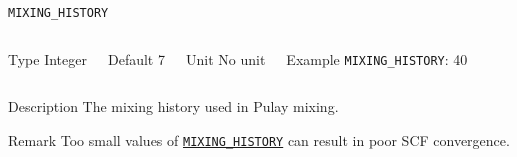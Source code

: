 \begin{frame}[allowframebreaks]{\texttt{MIXING\_HISTORY}} \label{MIXING_HISTORY}
\vspace*{-12pt}
\begin{columns}
\begin{block}{Type}
Integer
\end{block}

\begin{block}{Default}
7
\end{block}

\begin{block}{Unit}
No unit
\end{block}

\begin{block}{Example}
\texttt{MIXING\_HISTORY}: 40
\end{block}
\end{columns}

\begin{block}{Description}
The mixing history used in Pulay mixing.
\end{block}

\begin{block}{Remark}
Too small values of \hyperlink{MIXING_HISTORY}{\texttt{MIXING\_HISTORY}} can result in poor SCF convergence.
\end{block}

\end{frame}



